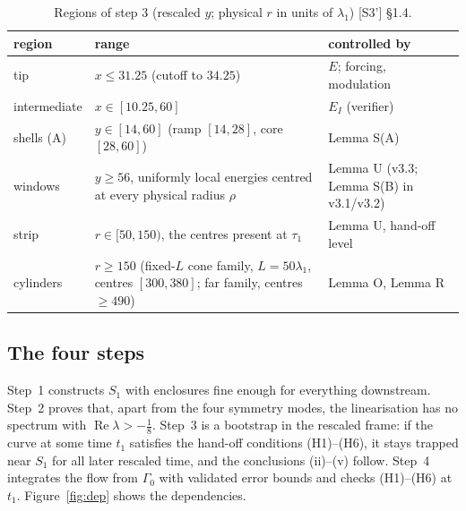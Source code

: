 \documentclass[11pt]{amsart}
\theoremstyle{definition}
\theoremstyle{remark}
\newcommand{\dref}[1]{[\textsf{#1}]}
\begin{document}
\begin{table}[htbp]\centering\small
\caption{Regions of step 3 (rescaled $y$; physical $r$ in units of $\lambda_1$) \dref{S3'} \S1.4.}\label{tab:regions}
\begin{tabular}{@{}lll@{}}\toprule
region & range & controlled by\\\midrule
tip & $x\le31.25$ (cutoff to $34.25$) & $E$; forcing, modulation\\
intermediate & $x\in[10.25,60]$ & $E_I$ (verifier)\\
shells (A) & $y\in[14,60]$ (ramp $[14,28]$, core $[28,60]$) & Lemma S(A)\\
windows & $y\ge56$, uniformly local energies centred at every physical radius $\rho$ & Lemma U (v3.3; Lemma S(B) in v3.1/v3.2)\\
strip & $r\in[50,150)$, the centres present at $\tau_1$ & Lemma U, hand-off level\\
cylinders & $r\ge150$ (fixed-$L$ cone family, $L=50\lambda_1$, centres $[300,380]$; far family, centres $\ge490$) & Lemma O, Lemma R\\\bottomrule
\end{tabular}\end{table}

\subsection{The four steps}
Step~1 constructs $S_1$ with enclosures fine enough for everything downstream. Step~2 proves that, apart from the four symmetry modes, the linearisation has no spectrum with $\operatorname{Re}\lambda>-\frac18$. Step~3 is a bootstrap in the rescaled frame: if the curve at some time $t_1$ satisfies the hand-off conditions (H1)--(H6), it stays trapped near $S_1$ for all later rescaled time, and the conclusions (ii)--(v) follow. Step~4 integrates the flow from $\Gamma_0$ with validated error bounds and checks (H1)--(H6) at $t_1$. Figure~\ref{fig:dep} shows the dependencies.
\end{document}
